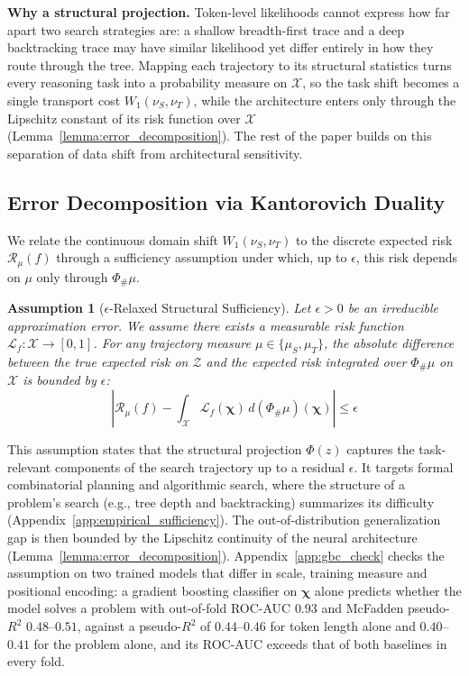 \documentclass{article}
\newtheorem{assumption}{Assumption}
\begin{document}
\textbf{Why a structural projection.} %
Token-level likelihoods cannot express how far apart two search strategies are: a shallow breadth-first trace and a deep backtracking trace may have similar likelihood yet differ entirely in how they route through the tree. Mapping each trajectory to its structural statistics turns every reasoning task into a probability measure on $\mathcal{X}$, so the task shift becomes a single transport cost $W_1(\nu_S,\nu_T)$, while the architecture enters only through the Lipschitz constant of its risk function over $\mathcal{X}$ (Lemma~\ref{lemma:error_decomposition}). The rest of the paper builds on this separation of data shift from architectural sensitivity.

\subsection{Error Decomposition via Kantorovich Duality}

We relate the continuous domain shift $W_1(\nu_S, \nu_T)$ to the discrete expected risk $\mathcal{R}_\mu(f)$ through a sufficiency assumption under which, up to $\epsilon$, this risk depends on $\mu$ only through $\Phi_\# \mu$.

\begin{assumption}[$\epsilon$-Relaxed Structural Sufficiency]
\label{assum:epsilon_relaxed}
Let $\epsilon > 0$ be an irreducible approximation error. We assume there exists a measurable risk function $\mathcal{L}_f: \mathcal{X} \to [0, 1]$. For any trajectory measure $\mu \in \{\mu_S, \mu_T\}$, the absolute difference between the true expected risk on $\mathcal{Z}$ and the expected risk integrated over $\Phi_\# \mu$ on $\mathcal{X}$ is bounded by $\epsilon$:
\begin{equation}
    \left| \mathcal{R}_{\mu}(f) - \int_{\mathcal{X}} \mathcal{L}_f(\boldsymbol{\chi}) \, d(\Phi_\# \mu)(\boldsymbol{\chi}) \right| \le \epsilon
\end{equation}
\end{assumption}

This assumption states that the structural projection $\Phi(z)$ captures the task-relevant components of the search trajectory up to a residual $\epsilon$. It targets formal combinatorial planning and algorithmic search, where the structure of a problem's search (e.g., tree depth and backtracking) summarizes its difficulty (Appendix~\ref{app:empirical_sufficiency}). The out-of-distribution generalization gap is then bounded by the Lipschitz continuity of the neural architecture (Lemma~\ref{lemma:error_decomposition}). Appendix~\ref{app:gbc_check} checks the assumption on two trained models that differ in scale, training measure and positional encoding: a gradient boosting classifier on $\boldsymbol{\chi}$ alone predicts whether the model solves a problem with out-of-fold ROC-AUC $0.93$ and McFadden pseudo-$R^2$ $0.48$--$0.51$, against a pseudo-$R^2$ of $0.44$--$0.46$ for token length alone and $0.40$--$0.41$ for the problem alone, and its ROC-AUC exceeds that of both baselines in every fold. %
\end{document}
